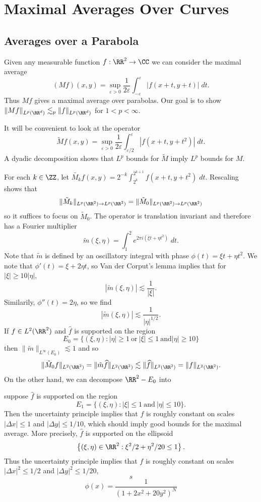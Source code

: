 \chapter{Maximal Averages Over Curves}

\section{Averages over a Parabola}

Given any measurable function $f: \RR^2 \to \CC$ we can consider the maximal average
%
\[ (Mf)(x,y) = \sup_{\varepsilon > 0} \frac{1}{2\varepsilon} \int_{-\varepsilon}^\varepsilon|f(x+t,y+t)|\; dt. \]
%
Thus $Mf$ gives a maximal average over parabolas. Our goal is to show $\| Mf \|_{L^p(\RR^d)} \lesssim_p \| f \|_{L^p(\RR^d)}$ for $1 < p < \infty$.

It will be convenient to look at the operator
%
\[ \tilde{M} f(x,y) = \sup_{\varepsilon > 0} \frac{1}{2\varepsilon} \int_{\varepsilon/2}^{\varepsilon} |f(x+t,y+t^2)|\; dt. \]
%
A dyadic decomposition shows that $L^p$ bounds for $\tilde{M}$ imply $L^p$ bounds for $M$.

For each $k \in \ZZ$, let $\tilde{M_k} f(x,y) = 2^{-k} \int_{2^k}^{2^{k+1}} f(x+t,y+t^2)\; dt$. Rescaling shows that
%
\[ \| \tilde{M}_k \|_{L^p(\RR^2) \to L^p(\RR^2)} = \| \tilde{M}_0 \|_{L^p(\RR^2) \to L^p(\RR^2)} \]
%
so it suffices to focus on $\tilde{M}_0$. The operator is translation invariant and therefore has a Fourier multiplier
%
\[ \tilde{m}(\xi,\eta) = \int_1^2 e^{2 \pi i (\xi t + \eta t^2)}\; dt. \]
%
Note that $\tilde{m}$ is defined by an oscillatory integral with phase $\phi(t) = \xi t + \eta t^2$. We note that $\phi'(t) = \xi + 2 \eta t$, so Van der Corput's lemma implies that for $|\xi| \geq 10|\eta|$,
%
\[ |\tilde{m}(\xi,\eta)| \lesssim \frac{1}{|\xi|}. \]
%
Similarily, $\phi''(t) = 2 \eta$, so we find
%
\[ |\tilde{m}(\xi,\eta)| \lesssim \frac{1}{|\eta|^{1/2}}. \]
%
If $f \in L^2(\RR^2)$ and $\widehat{f}$ is supported on the region
%
\[ E_0 = \{ (\xi,\eta) : |\eta| \geq 1\ \text{or}\ |\xi| \leq 1\ \text{and} |\eta| \geq 10 \} \]
%
then $\| \tilde{m} \|_{L^\infty(E_0)} \lesssim 1$ and so
%
\[ \| \tilde{M}_0 f \|_{L^2(\RR^2)} = \| \tilde{m} \widehat{f} \|_{L^2(\RR^2)} \lesssim \| \widehat{f} \|_{L^2(\RR^2)} = \| f \|_{L^2(\RR^2)}. \]
%
On the other hand, we can decompose $\RR^2 - E_0$ into

suppose $\widehat{f}$ is supported on the region
%
\[ E_1 = \{ (\xi,\eta) : |\xi| \leq 1\ \text{and}\ |\eta| \leq 10 \}. \]
%
Then the uncertainty principle implies that $f$ is roughly constant on scales $|\Delta x| \leq 1$ and $|\Delta y| \leq 1/10$, which should imply good bounds for the maximal average. More precisely, $\widehat{f}$ is supported on the ellipsoid
%
\[ \left\{ (\xi,\eta) \in \RR^2 : \xi^2/2 + \eta^2/20 \leq 1 \right\}. \]
%
Thus the uncertainty principle implies that $f$ is roughly constant on scales $|\Delta x|^2 \leq 1/2$ and $|\Delta y|^2 \leq 1/20$,
%
\[ s \]
%
\[ \phi(x) = \frac{1}{( 1 + 2 x^2 + 20 y^2 )^N} \]  
